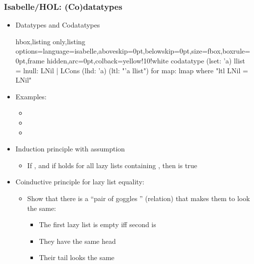 \documentclass[aspectratio=169,10pt]{beamer}
\begin{document}
\begin{frame}[fragile]
  \frametitle{Isabelle/HOL: (Co)datatypes}
  \begin{itemize}
    \item Datatypes and Codatatypes
\vspace*{-1ex}
          \begin{tcblisting}{hbox,listing only,listing options={language=isabelle,aboveskip=0pt,belowskip=0pt},size=fbox,boxrule=0pt,frame hidden,arc=0pt,colback=yellow!10!white}
codatatype (lset: 'a) llist = lnull: LNil | LCons (lhd: 'a) (ltl: "'a llist")
  for map: lmap where "ltl LNil = LNil"
          \end{tcblisting}
\vspace*{-1ex}
    \item Examples:
          \begin{itemize}
            \item {}
            \item {}
            \item {}
          \end{itemize}
\vspace*{-1ex}
          \pause
    \item Induction principle with  assumption
          \begin{itemize}
            \item If , and if  holds for all lazy lists containing , then  is true
          \end{itemize}
          \pause
    \item Coinductive principle for lazy list equality:
          \begin{itemize}
            \item Show that there is a ``pair of goggles '' (relation) that makes them to look the same:
                  \begin{itemize}
                    \item The first lazy list is empty iff second is
                    \item They have the same head
                    \item Their tail looks the same
                  \end{itemize}
          \end{itemize}
  \end{itemize}
\vspace*{-1ex}
\begin{overlayarea}{\textwidth}{.45\textheight}
  \begin{figure}
    \centering
  \end{figure}
\end{overlayarea}
\end{frame}
\end{document}
